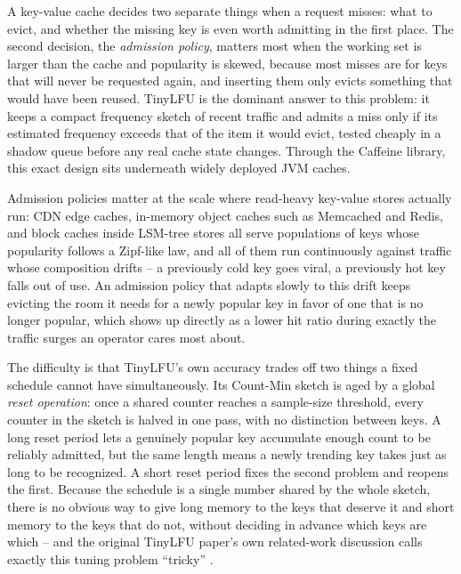 \documentclass[11pt,letterpaper]{article}
\begin{document}
A key-value cache decides two separate things when a request misses: what to evict, and whether the missing key is even worth admitting in the first place. The second decision, the \emph{admission policy}, matters most when the working set is larger than the cache and popularity is skewed, because most misses are for keys that will never be requested again, and inserting them only evicts something that would have been reused. TinyLFU \citep{Einziger2017} is the dominant answer to this problem: it keeps a compact frequency sketch of recent traffic and admits a miss only if its estimated frequency exceeds that of the item it would evict, tested cheaply in a shadow queue before any real cache state changes. Through the Caffeine library, this exact design sits underneath widely deployed JVM caches.

Admission policies matter at the scale where read-heavy key-value stores actually run: CDN edge caches, in-memory object caches such as Memcached and Redis, and block caches inside LSM-tree stores all serve populations of keys whose popularity follows a Zipf-like law, and all of them run continuously against traffic whose composition drifts -- a previously cold key goes viral, a previously hot key falls out of use. An admission policy that adapts slowly to this drift keeps evicting the room it needs for a newly popular key in favor of one that is no longer popular, which shows up directly as a lower hit ratio during exactly the traffic surges an operator cares most about.

The difficulty is that TinyLFU's own accuracy trades off two things a fixed schedule cannot have simultaneously. Its Count-Min sketch is aged by a global \emph{reset operation}: once a shared counter reaches a sample-size threshold, every counter in the sketch is halved in one pass, with no distinction between keys. A long reset period lets a genuinely popular key accumulate enough count to be reliably admitted, but the same length means a newly trending key takes just as long to be recognized. A short reset period fixes the second problem and reopens the first. Because the schedule is a single number shared by the whole sketch, there is no obvious way to give long memory to the keys that deserve it and short memory to the keys that do not, without deciding in advance which keys are which -- and the original TinyLFU paper's own related-work discussion calls exactly this tuning problem ``tricky'' \citep{Einziger2017}.
\end{document}
